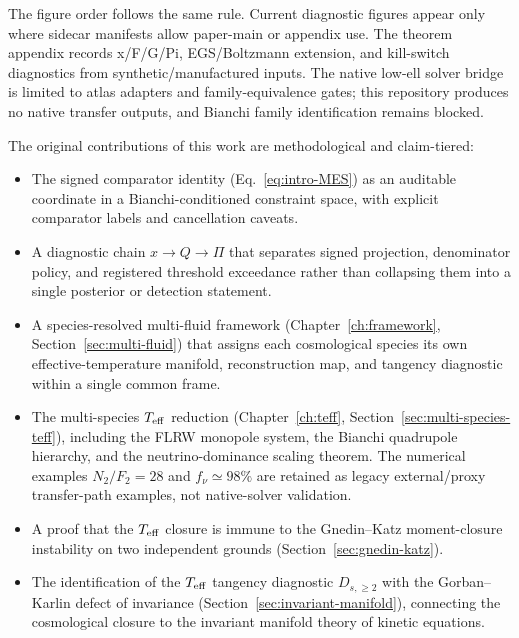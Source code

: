 The figure order follows the same rule.  Current diagnostic
figures appear only where sidecar manifests allow paper-main or
appendix use.  The theorem appendix records x/F/G/Pi,
EGS/Boltzmann extension, and kill-switch diagnostics from
synthetic/manufactured inputs.  The native low-ell solver bridge
is limited to atlas adapters and family-equivalence gates; this
repository produces no native transfer outputs, and Bianchi family
identification remains blocked.



The original contributions of this work are methodological and
claim-tiered:

\begin{itemize}

\item The signed comparator identity
  (Eq.~\ref{eq:intro-MES}) as an auditable coordinate in
  a Bianchi-conditioned constraint space, with explicit
  comparator labels and cancellation caveats.

\item A diagnostic chain $x \to Q \to \Pi$ that separates
  signed projection, denominator policy, and registered
  threshold exceedance rather than collapsing them into a
  single posterior or detection statement.

\item A species-resolved multi-fluid framework
  (Chapter~\ref{ch:framework},
  Section~\ref{sec:multi-fluid}) that assigns each
  cosmological species its own effective-temperature
  manifold, reconstruction map, and tangency diagnostic
  within a single common frame.

\item The multi-species $T_{\mathrm{eff}}$ reduction
  (Chapter~\ref{ch:teff},
  Section~\ref{sec:multi-species-teff}), including the
  FLRW monopole system, the Bianchi quadrupole hierarchy,
  and the neutrino-dominance scaling theorem.  The numerical
  examples $N_2/F_2 = 28$ and $f_\nu \simeq 98\%$ are retained as
  legacy external/proxy transfer-path examples, not native-solver
  validation.

\item A proof that the $T_{\mathrm{eff}}$ closure is immune to the
  Gnedin--Katz moment-closure instability on two
  independent grounds (Section~\ref{sec:gnedin-katz}).

\item The identification of the $T_{\mathrm{eff}}$ tangency diagnostic
  $D_{s,\geq 2}$ with the Gorban--Karlin defect of
  invariance (Section~\ref{sec:invariant-manifold}),
  connecting the cosmological closure to the invariant
  manifold theory of kinetic equations.


\end{itemize}

